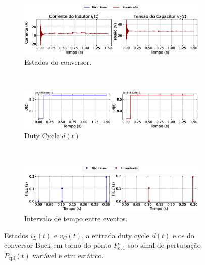 \begin{figure}[H]
  \centering
  \captionsetup{justification=centering}
  \begin{subfigure}{1.\textwidth}
    \centering
    \includegraphics[width=1.\textwidth]{figuras/static-etm/buck/sim2/op1/result.eps}
    \caption{Estados do conversor.}
    \label{fig:buck_converter_variable_pcpl_static_etm_op1_duty_a}
  \end{subfigure}
  \\[6pt]
  \begin{subfigure}{1.\textwidth}
    \centering
    \includegraphics[width=1.\textwidth]{figuras/static-etm/buck/sim2/op1/duty-cycle.eps}
    \caption{Duty Cycle $d(t)$}
    \label{fig:buck_converter_variable_pcpl_static_etm_op1_duty_b}
  \end{subfigure}
  \\[6pt]
  \begin{subfigure}{1.\textwidth}
    \centering
    \includegraphics[width=1.\textwidth]{figuras/static-etm/buck/sim2/op1/inter-event-times.eps}
    \caption{Intervalo de tempo entre eventos.}
    \label{fig:buck_converter_variable_pcpl_static_etm_op1_duty_c}
  \end{subfigure}
  \caption{Estados $i_L(t)$ e $v_C(t)$, a entrada duty cycle $d(t)$ e os  do conversor Buck em torno do ponto $P_{\mathrm{o}, 1}$ sob sinal de pertubação $P_{\mathrm{cpl}}(t)$ variável e \acrshort{etm} estático.}
\end{figure}

